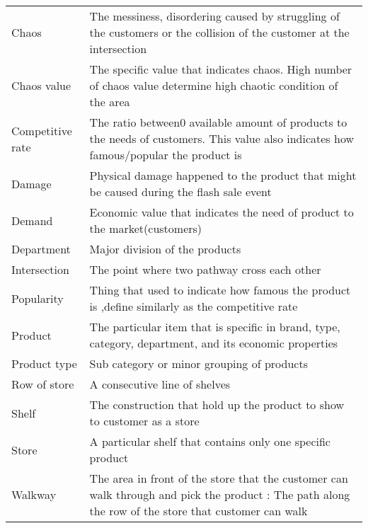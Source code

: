 \begin{tabular}{p{40mm} p{100mm}}
    Chaos & The messiness, disordering caused by struggling of the customers or the collision of the customer at the intersection \newline\\
    Chaos value & The specific value that indicates chaos. High number of chaos value determine high chaotic condition of the area \newline\\
    Competitive rate & The ratio between0 available amount of products to the needs of customers. This value also indicates how famous/popular the product is \newline\\
    Damage & Physical damage happened to the product that might be caused during the flash sale event \newline\\
    Demand  & Economic value that indicates the need of product to the market(customers)\newline \\
    Department & Major division of the products \newline\\
    Intersection & The point where two pathway cross each other \newline\\
    Popularity & Thing that used to indicate how famous the product is ,define similarly as the competitive rate \newline\\
    Product & The particular item that is specific in brand, type, category, department, and its economic properties  \newline\\
    Product type & Sub category or minor grouping of products\newline\\
    Row of store & A consecutive line of shelves  \newline\\
    Shelf & The construction that hold up the product to show to customer as a store \newline \\
    Store & A particular shelf that contains only one specific product \newline\\
    Walkway & The area in front of the store that the customer can walk through and pick the product : The path along the row of the store that customer can walk \newline\\
\end{tabular}
